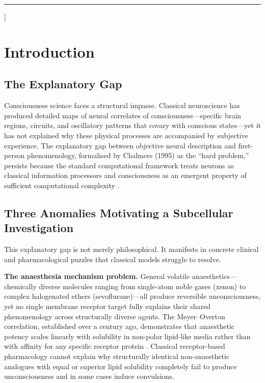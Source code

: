 \documentclass[10pt, a4paper, twocolumn]{article}
\begin{document}
  \noindent\rule{\textwidth}{0.4pt}
  \vspace{1em}
]

\section{Introduction}

\subsection{The Explanatory Gap}

Consciousness science faces a structural impasse. Classical neuroscience
has produced detailed maps of neural correlates of
consciousness---specific brain regions, circuits, and oscillatory
patterns that covary with conscious states---yet it has not explained why
these physical processes are accompanied by subjective experience. The
explanatory gap between objective neural description and first-person
phenomenology, formalised by Chalmers (1995) as the ``hard problem,''
persists because the standard computational framework treats neurons as
classical information processors and consciousness as an emergent
property of sufficient computational complexity \cite{chalmers1995}.

\subsection{Three Anomalies Motivating a Subcellular Investigation}

This explanatory gap is not merely philosophical. It manifests in
concrete clinical and pharmacological puzzles that classical models
struggle to resolve.

\textbf{The anaesthesia mechanism problem.} General volatile
anaesthetics---chemically diverse molecules ranging from single-atom
noble gases (xenon) to complex halogenated ethers
(sevoflurane)---all produce reversible unconsciousness, yet no single
membrane receptor target fully explains their shared phenomenology
across structurally diverse agents. The Meyer--Overton correlation,
established over a century ago, demonstrates that anaesthetic potency
scales linearly with solubility in non-polar lipid-like media rather
than with affinity for any specific receptor protein
\cite{craddock2017}. Classical receptor-based pharmacology cannot
explain why structurally identical non-anaesthetic analogues with equal
or superior lipid solubility completely fail to produce unconsciousness
and in some cases induce convulsions.
\end{document}
